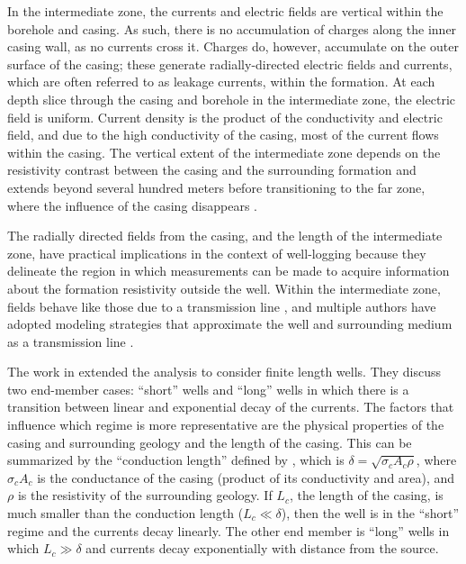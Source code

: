 \documentclass[
    paper
]{geophysics}
\begin{document}


In the intermediate zone, the currents and electric fields are vertical within the borehole and casing. As such, there is no accumulation of charges along the inner casing wall, as no currents cross it. Charges do, however, accumulate on the outer surface of the casing; these generate radially-directed electric fields and currents, which are often referred to as leakage currents, within the formation. At each depth slice through the casing and borehole in the intermediate zone, the electric field is uniform. Current density is the product of the conductivity and electric field, and due to the high conductivity of the casing, most of the current flows within the casing. The vertical extent of the intermediate zone depends on the resistivity contrast between the casing and the surrounding formation and extends beyond several hundred meters before transitioning to the far zone, where the influence of the casing disappears \citep{Kaufman1990}.

The radially directed fields from the casing, and the length of the intermediate zone, have practical implications in the context of well-logging because they delineate the region in which measurements can be made to acquire information about the formation resistivity outside the well. Within the intermediate zone, fields behave like those due to a transmission line \citep{Kaufman1990}, and multiple authors have adopted modeling strategies that approximate the well and surrounding medium as a transmission line \citep{Kong2009, Aldridge2015}.

The work in \cite{Kaufman1993} extended the analysis to consider finite length wells. They discuss two end-member cases: ``short'' wells and ``long'' wells in which there is a transition between linear and exponential decay of the currents. The factors that influence which regime is more representative are the physical properties of the casing and surrounding geology and the length of the casing. This can be summarized by the ``conduction length'' defined by \cite{Schenkel1991}, which is $\delta = \sqrt{\sigma_c A_c \rho}$, where $\sigma_c A_c$ is the conductance of the casing (product of its conductivity and area), and $\rho$ is the resistivity of the surrounding geology. If $L_c$, the length of the casing, is much smaller than the conduction length ($L_c \ll \delta$), then the well is in the ``short'' regime and the currents decay linearly. The other end member is ``long'' wells in which $L_c \gg \delta$ and currents decay exponentially with distance from the source.
\end{document}
